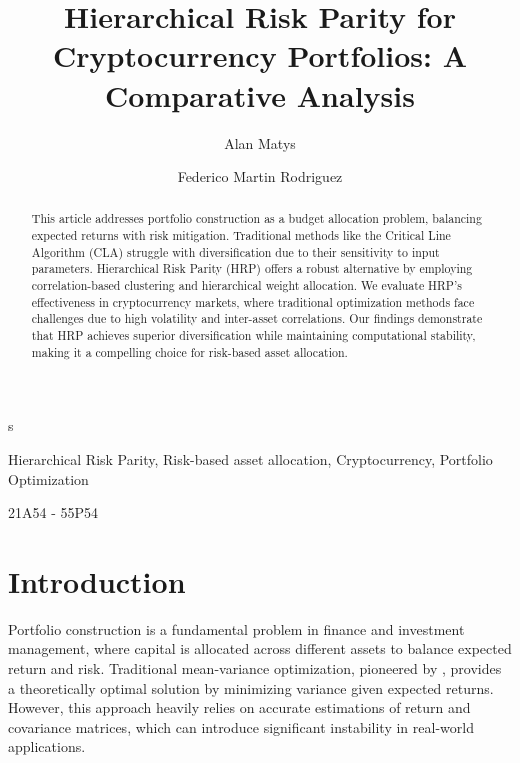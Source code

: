 \documentclass[english]{maciarticle}
\begin{document}
\title{Hierarchical Risk Parity for Cryptocurrency Portfolios: A Comparative Analysis}

\author[$\flat$]{Alan Matys}
\author[$\dag$]{Federico Martin Rodriguez}
s
\maketitle

\begin{abstract}
This article addresses portfolio construction as a budget allocation problem, balancing expected returns with risk mitigation. Traditional methods like the Critical Line Algorithm (CLA) struggle with diversification due to their sensitivity to input parameters. Hierarchical Risk Parity (HRP) offers a robust alternative by employing correlation-based clustering and hierarchical weight allocation. We evaluate HRP’s effectiveness in cryptocurrency markets, where traditional optimization methods face challenges due to high volatility and inter-asset correlations. Our findings demonstrate that HRP achieves superior diversification while maintaining computational stability, making it a compelling choice for risk-based asset allocation.
\end{abstract}

\begin{keywords}
Hierarchical Risk Parity, Risk-based asset allocation, Cryptocurrency, Portfolio Optimization
\end{keywords}

\begin{mathsubclass}
21A54 - 55P54
\end{mathsubclass}

{\thispagestyle{empty}} %

\section{Introduction}

Portfolio construction is a fundamental problem in finance and investment management, where capital is allocated across different assets to balance expected return and risk. Traditional mean-variance optimization, pioneered by \citet{markowitz1952portfolio}, provides a theoretically optimal solution by minimizing variance given expected returns. However, this approach heavily relies on accurate estimations of return and covariance matrices, which can introduce significant instability in real-world applications.
\end{document}
